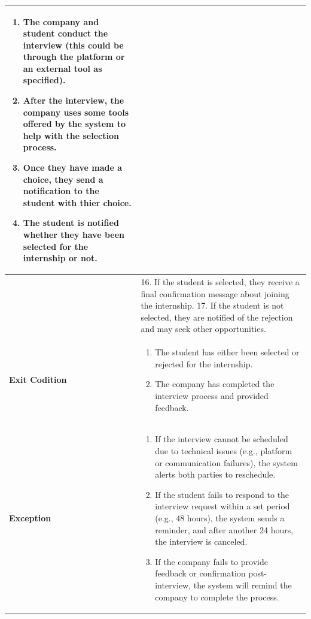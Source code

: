 \begin{longtable}{|p{}|p{}|}
\begin{enumerate}
    \item The company and student conduct the interview (this could be through the platform or an external tool as specified).
    \item After the interview, the company uses some tools offered by the system to help with the selection process.
    \item Once they have made a choice, they send a notification to the student with thier choice.
    \item The student is notified whether they have been selected for the internship or not.
\end{enumerate} \\
\hline
  &  
    16. If the student is selected, they receive a final confirmation message about joining the internship.
    17. If the student is not selected, they are notified of the rejection and may seek other opportunities.
\\
\hline
\textbf{Exit Codition} &  
\begin{enumerate}
    \item The student has either been selected or rejected for the internship.
    \item The company has completed the interview process and provided feedback.
\end{enumerate}\\
\hline
\textbf{Exception} &  
\begin{enumerate}
    \item If the interview cannot be scheduled due to technical issues (e.g., platform or communication failures), the system alerts both parties to reschedule.
    \item If the student fails to respond to the interview request within a set period (e.g., 48 hours), the system sends a reminder, and after another 24 hours, the interview is canceled.
    \item If the company fails to provide feedback or confirmation post-interview, the system will remind the company to complete the process.
\end{enumerate} \\
\hline
\end{longtable}

